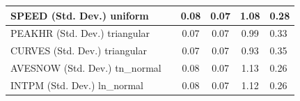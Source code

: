 \begin{table}
\begin{center}
\begin{tabular}{|l|l|c|c|c|l|}
			\hline
			SPEED (Std. Dev.) uniform &  & 0.08 & 0.07 & 1.08 & 0.28 \\
			\hline
			PEAKHR (Std. Dev.) triangular &  & 0.07 & 0.07 & 0.99 & 0.33 \\
			\hline
			CURVES (Std. Dev.) triangular &  & 0.07 & 0.07 & 0.93 & 0.35 \\
			\hline
			AVESNOW (Std. Dev.) tn_normal &  & 0.08 & 0.07 & 1.13 & 0.26 \\
			\hline
			INTPM (Std. Dev.) ln_normal &  & 0.08 & 0.07 & 1.12 & 0.26 \\
			\hline
		\end{tabular}
	\end{center}
\end{table}